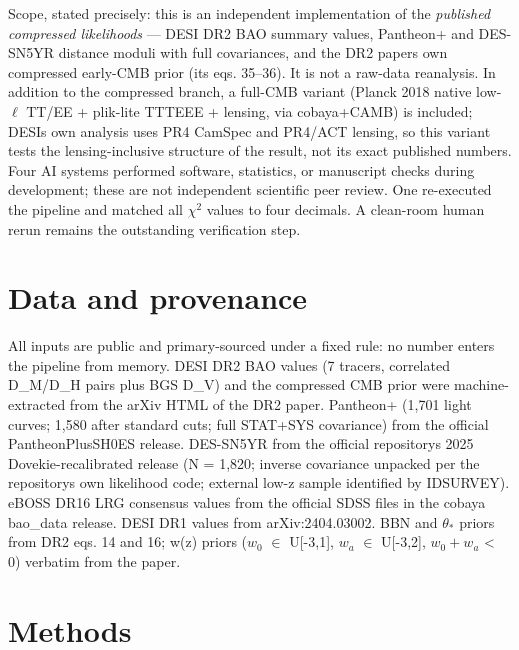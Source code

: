 \documentclass[aps,prd,preprint,superscriptaddress,nofootinbib]{revtex4-2}
\begin{document}
Scope, stated precisely: this is an independent implementation of the
\emph{published compressed likelihoods} --- DESI DR2 BAO summary values,
Pantheon+ and DES-SN5YR distance moduli with full covariances, and the
DR2 paper\textquotesingle s own compressed early-CMB prior (its eqs.
35--36). It is not a raw-data reanalysis. In addition to the compressed
branch, a full-CMB variant (Planck 2018 native low-\(\ell\) TT/EE +
plik-lite TTTEEE + lensing, via cobaya+CAMB) is included;
DESI\textquotesingle s own analysis uses PR4 CamSpec and PR4/ACT
lensing, so this variant tests the lensing-inclusive structure of the
result, not its exact published numbers. Four AI systems performed
software, statistics, or manuscript checks during development; these are
not independent scientific peer review. One re-executed the pipeline and
matched all \(\chi^2\) values to four decimals. A clean-room human rerun
remains the outstanding verification step.

\section{Data and provenance}\label{data-and-provenance}

All inputs are public and primary-sourced under a fixed rule: no number
enters the pipeline from memory. DESI DR2 BAO values (7 tracers,
correlated D\_M/D\_H pairs plus BGS D\_V) and the compressed CMB prior
were machine-extracted from the arXiv HTML of the DR2 paper. Pantheon+
(1,701 light curves; 1,580 after standard cuts; full STAT+SYS
covariance) from the official PantheonPlusSH0ES release. DES-SN5YR from
the official repository\textquotesingle s 2025 Dovekie-recalibrated
release (N = 1,820; inverse covariance unpacked per the
repository\textquotesingle s own likelihood code; external low-z sample
identified by IDSURVEY). eBOSS DR16 LRG consensus values from the
official SDSS files in the cobaya bao\_data release. DESI DR1 values
from arXiv:2404.03002. BBN and \(\theta_*\) priors from DR2 eqs. 14 and
16; w(z) priors (\(w_0\) \(\in\) U{[}-3,1{]}, \(w_a\) \(\in\)
U{[}-3,2{]}, \(w_0+w_a\) \textless{} 0) verbatim from the paper.

\section{Methods}\label{methods}
\end{document}

